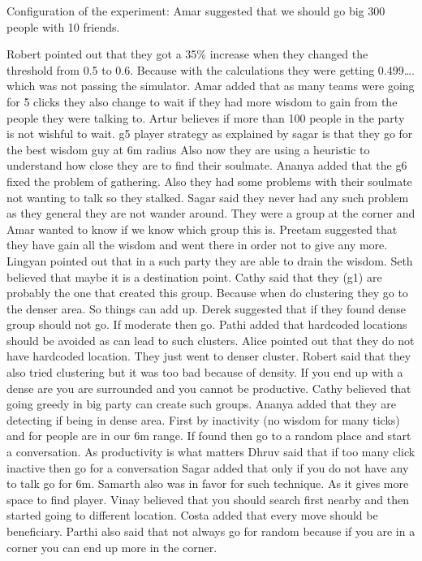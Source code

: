 Configuration of the experiment:
Amar suggested that we should go big 300 people with 10 friends.

Robert pointed out that they got a 35\% increase when they changed the threshold 
from 0.5 to 0.6. Because with the calculations they were getting 0.499…. which 
was not passing the simulator.
Amar added that as many teams were going for 5 clicks they also change to wait 
if they had more wisdom to gain from the people they were talking to.
Artur believes if more than 100 people in the party is not wishful to wait.
g5 player strategy as explained by sagar is that they go for the best wisdom guy at 6m radius
Also now they are using a heuristic to understand how close they are to find their soulmate.
Ananya added that the g6 fixed the problem of gathering. Also they had some problems with their soulmate not wanting to talk so they stalked. 
Sagar said they never had any such problem as they general they are not wander around.
They were a group at the corner and Amar wanted to know if we know which group this is.
Preetam suggested that they have gain all the wisdom and went there in order not to give any more. 
Lingyan pointed out that in a such party they are able to drain the wisdom.
Seth believed that maybe it is a destination point.
Cathy said that they (g1) are probably the one that created this group. Because 
when do clustering they go to the denser area. So things can add up.
Derek suggested that if they found dense group should not go. If moderate then go.
Pathi added that hardcoded locations should be avoided as can lead to such clusters.
Alice pointed out that they do not have hardcoded location. They just went to denser cluster.
Robert said that they also tried clustering but it was too bad because of density. If you end up with a dense are you are surrounded and you cannot be productive.
Cathy believed that going greedy in big party can create such groups.
Ananya added that they are detecting if being in dense area. First by inactivity (no wisdom for many ticks) and for people are in our 6m range. If found then go to a random place and start a conversation.
As productivity is what matters Dhruv said that if too many click inactive then go for a conversation
Sagar added that only if you do not have any to talk go for 6m.
Samarth also was in favor for such technique. As it gives more space to find player.
Vinay believed that you should search first nearby and then started going to different location.
Costa added that every move should be beneficiary.
Parthi also said that not always go for random because if you are in a corner you can end up more in the corner.


